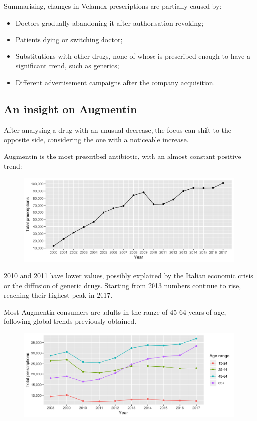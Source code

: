Summarising, changes in Velamox prescriptions are partially caused by:
\begin{itemize}
	\item Doctors gradually abandoning it after authorisation revoking;
	\item Patients dying or switching doctor;
	\item Substitutions with other drugs, none of whose is prescribed enough to have a significant trend, such as generics;
	\item Different advertisement campaigns after the company acquisition.
\end{itemize}

\subsection{An insight on Augmentin}
After analysing a drug with an unusual decrease, the focus can shift to the opposite side, considering the one with a noticeable increase.

Augmentin is the most prescribed antibiotic, with an almost constant positive trend:

\begin{figure}[h]
	\centering
	\includegraphics[scale=0.3]{../plots/augmentin-year.png}
\end{figure}

2010 and 2011 have lower values, possibly explained by the Italian economic crisis or the diffusion of generic drugs. Starting from 2013 numbers continue to rise, reaching their highest peak in 2017.

Most Augmentin consumers are adults in the range of 45-64 years of age, following global trends previously obtained.

\begin{figure}[h]
	\centering
	\includegraphics[scale=0.3]{../plots/augmentin_age-year.png}
\end{figure}

